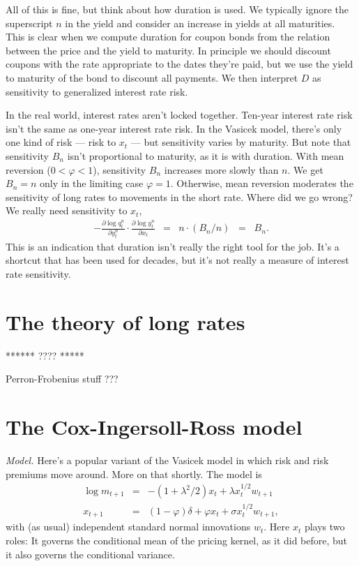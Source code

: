 \documentclass[11pt]{article}
\begin{document}
All of this is fine, but think about how duration is used.
We typically ignore the superscript $n$ in the yield and consider
an increase in yields at all maturities.
This is clear when we compute duration for coupon bonds from the
relation between the price and the yield to maturity.
In principle we should discount coupons with the rate appropriate
to the dates they're paid, but we use the yield to maturity
of the bond to discount all payments.
We then interpret $D$ as sensitivity to generalized interest rate risk.

In the real world, interest rates aren't locked together.
Ten-year interest rate risk isn't the same as one-year interest rate risk.
In the Vasicek model, there's only one kind of risk --- risk to $x_t$ ---
but sensitivity varies by maturity.
But note that sensitivity $B_n$ isn't proportional to maturity,
as it is with duration.
With mean reversion ($0 < \varphi < 1$), sensitivity $B_n$ increases more slowly than $n$.
We get $B_n = n$ only in the limiting case $\varphi = 1$.
Otherwise, mean reversion moderates the sensitivity of long rates to movements in
the short rate.
Where did we go wrong?
We really need sensitivity to $x_t$,
\begin{eqnarray*}
     - \frac{\partial \log q^n_t}{\partial y^n_t}
      \cdot \frac{\partial \log y^n_t}{\partial x_t} &=& n \cdot (B_n/n) \;\;=\;\; B_n.
\end{eqnarray*}
This is an indication that duration isn't really the right tool for the job.
It's a shortcut that has been used for decades,
but it's not really a measure of interest rate sensitivity.


\section{The theory of long rates}

****** ???? *****

Perron-Frobenius stuff ???



\section{The Cox-Ingersoll-Ross model}


{\it Model.\/}
Here's a popular variant of the Vasicek model
in which risk and risk premiums move around.
More on that shortly.
The model is
\begin{eqnarray}
    \log m_{t+1} &=& - (1+\lambda^2/2 ) x_t + \lambda x_t^{1/2} w_{t+1} \nonumber \\
         x_{t+1} &=& (1-\varphi) \delta + \varphi x_t + \sigma x_t^{1/2} w_{t+1} ,
         \label{eq:square-root}
\end{eqnarray}
with (as usual) independent standard normal innovations $w_t$.
Here $x_t$ plays two roles:  It governs the conditional mean
of the pricing kernel, as it did before,
but it also governs the conditional variance.
\end{document}
